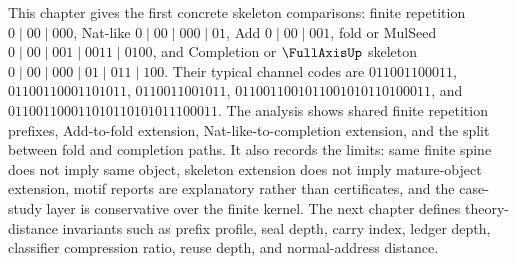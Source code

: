 \begin{remark}[Outlook]
\label{rem:case-studies-outlook}
This chapter gives the first concrete skeleton comparisons: finite repetition $0\mid 00\mid 000$, Nat-like $0\mid 00\mid 000\mid 01$, Add $0\mid 00\mid 001$, fold or MulSeed $0\mid 00\mid 001\mid 0011\mid 0100$, and Completion or $\FullAxisUp$ skeleton $0\mid 00\mid 000\mid 01\mid 011\mid 100$. Their typical channel codes are $011001100011$, $01100110001101011$, $0110011001011$, $0110011001011001010110100011$, and $011001100011010110101011100011$. The analysis shows shared finite repetition prefixes, Add-to-fold extension, Nat-like-to-completion extension, and the split between fold and completion paths. It also records the limits: same finite spine does not imply same object, skeleton extension does not imply mature-object extension, motif reports are explanatory rather than certificates, and the case-study layer is conservative over the finite kernel. The next chapter defines theory-distance invariants such as prefix profile, seal depth, carry index, ledger depth, classifier compression ratio, reuse depth, and normal-address distance.
\end{remark}
